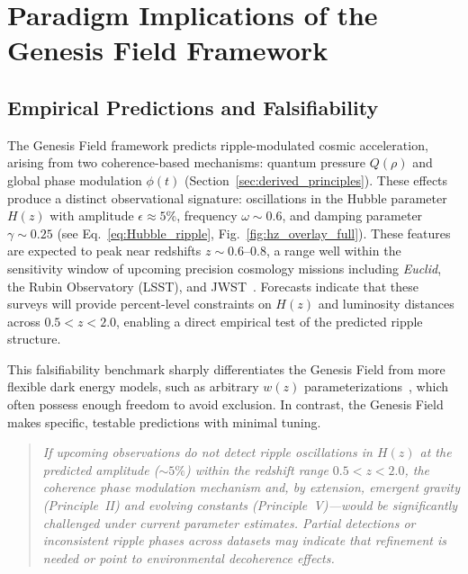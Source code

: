 \section{Paradigm Implications of the Genesis Field Framework}
\label{interpretation}

\subsection{Empirical Predictions and Falsifiability}

The Genesis Field framework predicts ripple-modulated cosmic acceleration, arising from two coherence-based mechanisms: quantum pressure \( Q(\rho) \) and global phase modulation \( \phi(t) \) (Section~\ref{sec:derived_principles}). These effects produce a distinct observational signature: oscillations in the Hubble parameter \( H(z) \) with amplitude \( \epsilon \approx 5\% \), frequency \( \omega \sim 0.6 \), and damping parameter \( \gamma \sim 0.25 \) (see Eq.~\ref{eq:Hubble_ripple}, Fig.~\ref{fig:hz_overlay_full}). These features are expected to peak near redshifts \( z \sim 0.6 \)–\( 0.8 \), a range well within the sensitivity window of upcoming precision cosmology missions including \textit{Euclid}, the Rubin Observatory (LSST), and JWST~\cite{Laureijs2011,LSST2009,Gardner2006}. Forecasts indicate that these surveys will provide percent-level constraints on \( H(z) \) and luminosity distances across \( 0.5 < z < 2.0 \), enabling a direct empirical test of the predicted ripple structure.

This falsifiability benchmark sharply differentiates the Genesis Field from more flexible dark energy models, such as arbitrary \( w(z) \) parameterizations~\cite{Chevallier2001,Linder2003}, which often possess enough freedom to avoid exclusion. In contrast, the Genesis Field makes specific, testable predictions with minimal tuning.

\begin{quote}
\textit{If upcoming observations do not detect ripple oscillations in \( H(z) \) at the predicted amplitude (\( \sim5\% \)) within the redshift range \( 0.5 < z < 2.0 \), the coherence phase modulation mechanism and, by extension, emergent gravity (Principle~II) and evolving constants (Principle~V)—would be significantly challenged under current parameter estimates. Partial detections or inconsistent ripple phases across datasets may indicate that refinement is needed or point to environmental decoherence effects.}
\end{quote}

